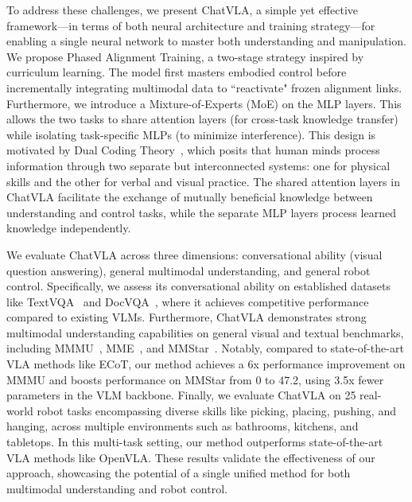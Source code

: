 To address these challenges, we present ChatVLA, a simple yet effective framework—in terms of both neural architecture and training strategy—for enabling a single neural network to master both understanding and manipulation. We propose Phased Alignment Training, a two-stage strategy inspired by curriculum learning. The model first masters embodied control before incrementally integrating multimodal data to ``reactivate" frozen alignment links. Furthermore, we introduce a Mixture-of-Experts (MoE) on the MLP layers. This allows the two tasks to share attention layers (for cross-task knowledge transfer) while isolating task-specific MLPs (to minimize interference). This design is motivated by Dual Coding Theory~\cite{paivio1991dual}, which posits that human minds process information through two separate but interconnected systems: one for physical skills and the other for verbal and visual practice. The shared attention layers in ChatVLA facilitate the exchange of mutually beneficial knowledge between understanding and control tasks, while the separate MLP layers process learned knowledge independently.

We evaluate ChatVLA across three dimensions: conversational ability (visual question answering), general multimodal understanding, and general robot control. Specifically, we assess its conversational ability on established datasets like TextVQA~\cite{textvqa} and DocVQA~\cite{mathew2021docvqa}, where it achieves competitive performance compared to existing VLMs. Furthermore, ChatVLA demonstrates strong multimodal understanding capabilities on general visual and textual benchmarks, including MMMU~\cite{yue2023mmmu}, MME~\cite{mme}, and MMStar~\cite{chen2024we}. Notably, compared to state-of-the-art VLA methods like ECoT, our method achieves a 6x performance improvement on MMMU and boosts performance on MMStar from 0 to 47.2, using 3.5x fewer parameters in the VLM backbone. Finally, we evaluate ChatVLA on 25 real-world robot tasks encompassing diverse skills like picking, placing, pushing, and hanging, across multiple environments such as bathrooms, kitchens, and tabletops. In this multi-task setting, our method outperforms state-of-the-art VLA methods like OpenVLA. These results validate the effectiveness of our approach, showcasing the potential of a single unified method for both multimodal understanding and robot control.

